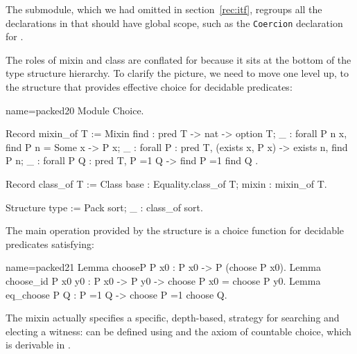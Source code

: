 The  submodule, which we had omitted in section~\ref{rec:itf},
regroups all the declarations in  that should have global scope,
such as the \lstinline/Coercion/ declaration for .

The roles of mixin and class are conflated for 
because it sits at the bottom of the type structure hierarchy. To
clarify the picture, we need to move one level up, to the
 structure that provides effective choice for decidable
predicates:

\begin{coq}{name=packed20}{}
Module Choice.

Record mixin_of T := Mixin {
  find : pred T -> nat -> option T;
  _ : forall P n x, find P n = Some x -> P x;
  _ : forall P : pred T, (exists x, P x) -> exists n, find P n;
  _ : forall P Q : pred T, P =1 Q -> find P =1 find Q
}.

Record class_of T :=
  Class {base : Equality.class_of T; mixin : mixin_of T}.

Structure type := Pack {sort; _ : class_of sort}.
\end{coq}


The main operation provided by the  structure  is a
choice function for decidable predicates
 satisfying:


\begin{coq}{name=packed21}{}
Lemma chooseP P x0 : P x0 -> P (choose P x0).
Lemma choose_id P x0 y0 : P x0 -> P y0 -> choose P x0 = choose P y0.
Lemma eq_choose P Q : P =1 Q -> choose P =1 choose Q.
\end{coq}

The mixin actually specifies a specific, depth-based,
strategy for searching and electing a witness:  can be
defined using  and the axiom of countable
choice, which is derivable in \mcbCIC{}%
.

